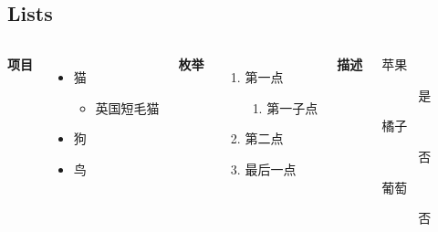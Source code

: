 \documentclass[
    11pt,
    notheorems,
    hyperref={pdfauthor=whatever}
]{beamer}
\begin{document}
\subsection{Lists}
\begin{frame}
    \begin{columns}[T,onlytextwidth]
            \textbf{项目}
            \begin{itemize}
                \item 猫
                \begin{itemize}
                    \item 英国短毛猫
                \end{itemize}
                \item 狗
                \item 鸟
            \end{itemize}

            \textbf{枚举}
            \begin{enumerate}
                \item 第一点
                \begin{enumerate}
                    \item 第一子点
                \end{enumerate}
                \item 第二点
                \item 最后一点
            \end{enumerate}

            \textbf{描述}
            \begin{description}
                \item[苹果] 是
                \item[橘子] 否
                \item[葡萄] 否
            \end{description}
    \end{columns}
\end{frame}

\end{document}

